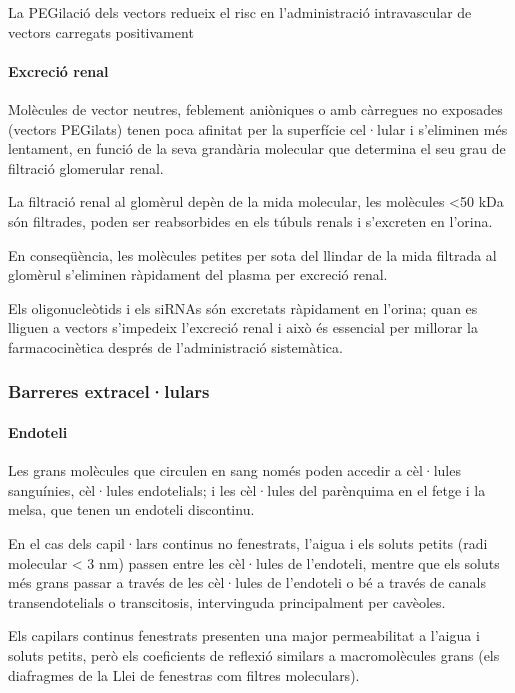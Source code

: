 La PEGilació dels vectors redueix el risc en l'administració intravascular de vectors carregats positivament

\paragraph{Excreció renal}
Molècules de vector neutres, feblement aniòniques o amb càrregues no exposades (vectors PEGilats) tenen poca afinitat per la superfície cel·lular i s'eliminen més lentament, en funció de la seva grandària molecular que determina el seu grau de filtració glomerular renal.

La filtració renal al glomèrul depèn de la mida molecular, les molècules <50 kDa són filtrades, poden ser reabsorbides en els túbuls renals i s'excreten en l'orina.

En conseqüència, les molècules petites per sota del llindar de la mida filtrada al glomèrul s'eliminen ràpidament del plasma per excreció renal.

Els oligonucleòtids i els siRNAs són excretats ràpidament en l'orina; quan es lliguen a vectors s'impedeix l'excreció renal i això és essencial per millorar la farmacocinètica després de l'administració sistemàtica.

\subsubsection{Barreres extracel·lulars}
\label{sec:barr-extr}

\paragraph{Endoteli}
Les grans molècules que circulen en sang només poden accedir a cèl·lules sanguínies, cèl·lules endotelials; i les cèl·lules del parènquima en el fetge i la melsa, que tenen un endoteli discontinu.

En el cas dels capil·lars continus no fenestrats, l'aigua i els soluts petits (radi molecular < 3 nm) passen entre les cèl·lules de l'endoteli, mentre que els soluts més grans passar a través de les cèl·lules de l'endoteli o bé a través de canals transendotelials o transcitosis, intervinguda principalment per cavèoles.

Els capilars continus fenestrats presenten una major permeabilitat a l'aigua i soluts petits, però els coeficients de reflexió similars a macromolècules grans (els diafragmes de la Llei de fenestras com filtres moleculars).

